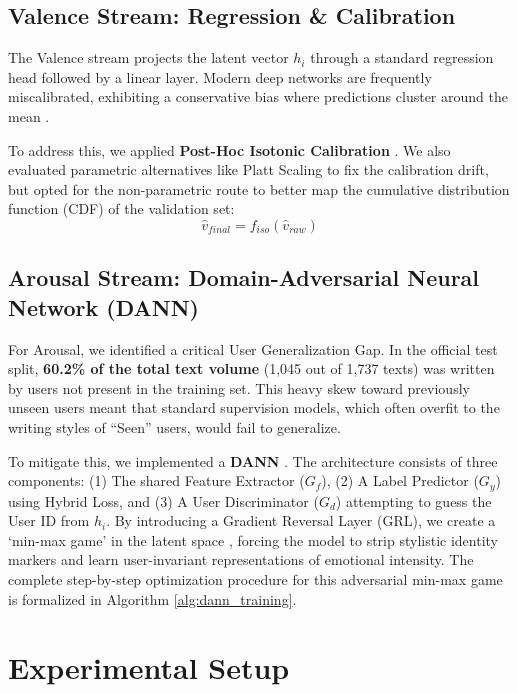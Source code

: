 \documentclass[11pt, a4paper]{article}
\begin{document}
\subsection{Valence Stream: Regression \& Calibration}
The Valence stream projects the latent vector $h_i$ through a standard regression head followed by a linear layer. Modern deep networks are frequently miscalibrated, exhibiting a conservative bias where predictions cluster around the mean \citep{guo2017calibration}. 

To address this, we applied \textbf{Post-Hoc Isotonic Calibration} \citep{zadrozny2002transforming}. We also evaluated parametric alternatives like Platt Scaling \citep{platt1999probabilistic} to fix the calibration drift, but opted for the non-parametric route to better map the cumulative distribution function (CDF) of the validation set:
\begin{equation}
    \hat{v}_{final} = f_{iso}(\hat{v}_{raw})
\end{equation}

\subsection{Arousal Stream: Domain-Adversarial Neural Network (DANN)}
For Arousal, we identified a critical User Generalization Gap. In the official test split, \textbf{60.2\% of the total text volume} (1,045 out of 1,737 texts) was written by users not present in the training set. This heavy skew toward previously unseen users meant that standard supervision models, which often overfit to the writing styles of ``Seen'' users, would fail to generalize.

To mitigate this, we implemented a {\textbf{DANN}} \citep{ajakan2014domain, ganin2016domain}. The architecture consists of three components: (1) The shared Feature Extractor ($G_f$), (2) A Label Predictor ($G_y$) using Hybrid Loss, and (3) A User Discriminator ($G_d$) attempting to guess the User ID from $h_i$. By introducing a Gradient Reversal Layer (GRL), we create a `min-max game' in the latent space \citep{tzeng2017adversarial}, forcing the model to strip stylistic identity markers and learn user-invariant representations of emotional intensity. The complete step-by-step optimization procedure for this adversarial min-max game is formalized in Algorithm \ref{alg:dann_training}.

\section{Experimental Setup}
\label{sec:experimental_setup}
\end{document}
